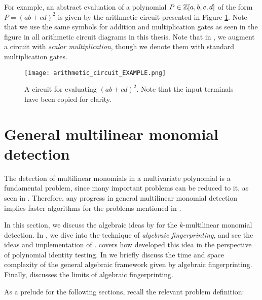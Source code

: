 For example, an abstract evaluation of a polynomial $P \in \mathbb Z[a,b,c,d]$ of the form 
$P = (ab+cd)^2$ is given by the arithmetic circuit presented in Figure \ref{fig:circuit_example}. 
Note that we use the same symbols for addition and multiplication gates as seen in the figure 
in all arithmetic circuit diagrams in this thesis. 
Note that in , we augment a circuit with \emph{scalar multiplication}, 
though we denote them with standard multiplication gates.

\begin{figure}[h]
  \texttt{[image: arithmetic\_circuit\_EXAMPLE.png]}
  \centering
  \caption{A circuit for evaluating $(ab+cd)^2$. 
  Note that the input terminals have been copied for clarity.}
  \label{fig:circuit_example}
\end{figure}

\section{General multilinear monomial detection}
\label{sect:general_mld}

The detection of multilinear monomials in a multivariate polynomial is a fundamental problem, 
since many important problems can be reduced to it, 
as seen in . 
Therefore, any progress in general multilinear monomial detection implies 
faster algorithms for the problems mentioned in .

In this section, 
we discuss the algebraic ideas by \citeauthor{KouWil09} \cite{Koutis08, Williams09, KouWil09} 
for the $k$-multilinear monomial detection. 
In , 
we dive into the technique of \emph{algebraic fingerprinting}, and 
see the ideas and implementation of \textcite{Koutis08}. 
 covers how 
\textcite{Williams09} developed this idea  
in the perspective of polynomial identity testing. 
In  we briefly discuss the time and space complexity 
of the general algebraic framework given by algebraic fingerprinting. 
Finally,  discusses the limits of algebraic fingerprinting.

As a prelude for the following sections, recall the relevant problem definition: 
\begin{problem}
\end{problem}

